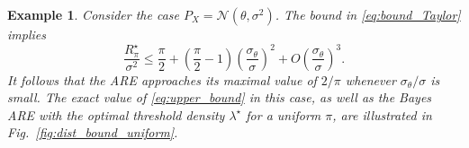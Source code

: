 \documentclass[letterpaper, conference, 11pt]{IEEEtran}      %
\newtheorem{prop}[thm]{\bf {Proposition}}
\newtheorem{example}{\bf {Example}}
\newenvironment{proof}{\paragraph*{Proof}}{\hfill$\square$ \newline}
\begin{document}
\begin{example} \label{ex:bound}
Consider the case $P_X = \mathcal N(\theta, \sigma^2)$. The bound in \eqref{eq:bound_Taylor} implies 
\[
\frac{R^\star_\pi}{\sigma^2}  \leq \frac{\pi}{2} + \left( \frac{\pi}{2} -1 \right) \left( \frac{ \sigma_\theta}{\sigma} \right)^2 + O \left(  \frac{\sigma_\theta} { \sigma} \right)^3. 
\]
It follows that the ARE approaches its maximal value of $2/\pi$ whenever $\sigma_\theta/\sigma$ is small. The exact value of \eqref{eq:upper_bound} in this case, as well as the Bayes ARE with the optimal threshold density $\lambda^\star$ for a uniform $\pi$, are illustrated in Fig.~\ref{fig:dist_bound_uniform}. 
\end{example}


\end{document}
